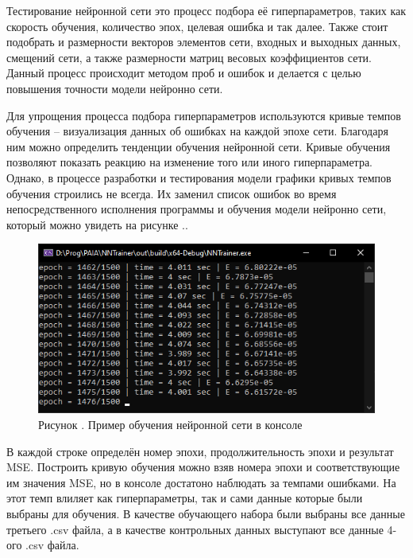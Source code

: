 {\gostFont

  \par \redline Тестирование нейронной сети это процесс подбора её гиперпараметров, таких как скорость обучения, количество эпох, целевая ошибка и так далее. Также стоит подобрать и размерности векторов элементов сети, входных и выходных данных, смещений сети, а также размерности матриц весовых коэффициентов сети. Данный процесс происходит методом проб и ошибок и делается с целью повышения точности модели нейронно сети. 

  \par \redline Для упрощения процесса подбора гиперпараметров используются кривые темпов обучения {--} визуализация данных об ошибках на каждой эпохе сети. Благодаря ним можно определить тенденции обучения нейронной сети. Кривые обучения позволяют показать реакцию на изменение того или иного гиперпараметра. Однако, в процессе разработки и тестирования модели графики кривых темпов обучения строились не всегда. Их заменил список ошибок во время непосредственного исполнения программы и обучения модели нейронно сети, который можно увидеть на рисунке \thechaptercntr .\theimagecntr.

  \begin{figure}[H]
    \centering
    \def\svgwidth{\textwidth}
    \includegraphics[width=120mm]{images/CurvedLerning.png}
    \caption*{\gostFont Рисунок \thechaptercntr .\theimagecntr \spc {--} Пример обучения нейронной сети в консоле}
    \label{fig:CurvedLerning}
  \end{figure} \addtocounter{imagecntr}{1}

  \par \redline В каждой строке определён номер эпохи, продолжительность эпохи и результат MSE. Построить кривую обучения можно взяв номера эпохи и соответствующие им значения MSE, но в консоле достатоно наблюдать за темпами ошибками. На этот темп влиляет как гиперпараметры, так и сами данные которые были выбраны для обучения. В качестве обучающего набора были выбраны все данные третьего .csv файла, а в качестве контрольных данных выступают все данные 4-ого .csv файла. 

}

